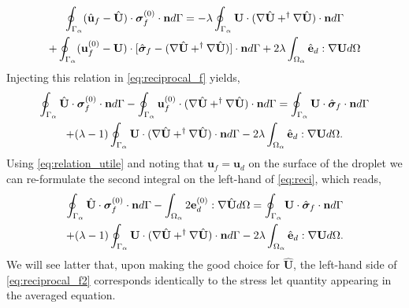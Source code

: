 \begin{multline}
    \oint_{\Gamma_{\alpha}} (\hat{\textbf{u}}_f - \hat{\textbf{U}})\cdot \bm\sigma_f^{(0)} \cdot \textbf{n} d\Gamma
    =
    - \lambda\oint_{\Gamma_{\alpha}}   \textbf{U} \cdot (\mathbf{\nabla} \hat{\textbf{U}} + ^\dagger\mathbf{\nabla} \hat{\textbf{U}})  \cdot \textbf{n} d\Gamma\\
    + \oint_{\Gamma_{\alpha}} (\textbf{u}_f^{(0)} - \textbf{U}) \cdot  [\hat{\bm\sigma}_f -(\mathbf{\nabla} \hat{\textbf{U}} + ^\dagger\mathbf{\nabla} \hat{\textbf{U}})]\cdot \textbf{n}  d\Gamma
    + 2\lambda\int_{\Omega_{\alpha}} \hat{\textbf{e}}_d : \mathbf{\nabla} \textbf{U} d\Omega 
\end{multline}
Injecting this relation in \ref{eq:reciprocal_f} yields, 
\begin{multline}
    \intS{\hat{\textbf{U}}\cdot  \bm\sigma_f^{(0)} \cdot \textbf{n}}
    - \intS{\textbf{u}_f^{(0)}\cdot  (\grad \hat{\textbf{U}} + ^\dagger\grad \hat{\textbf{U}})\cdot \textbf{n} }
    = 
    \intS{\textbf{U}\cdot  \hat{\bm\sigma}_f \cdot \textbf{n}}\\
    + (\lambda - 1)\intS{  \textbf{U} \cdot (\grad \hat{\textbf{U}} + ^\dagger\grad \hat{\textbf{U}})  \cdot \textbf{n}}
    - 2\lambda\intO{\hat{\textbf{e}}_d : \grad \textbf{U}}. 
    \label{eq:reci}
\end{multline}
Using \ref{eq:relation_utile} and noting that $\textbf{u}_f = \textbf{u}_d$ on the surface of the droplet we can re-formulate the second integral on the left-hand of \ref{eq:reci}, which reads,  
\begin{multline}
    \intS{\hat{\textbf{U}}\cdot  \bm\sigma_f^{(0)} \cdot \textbf{n}}
    - \intO{ 2\textbf{e}_d^{(0)} : \grad \hat{\textbf{U}} }
    = 
    \intS{\textbf{U}\cdot  \hat{\bm\sigma}_f \cdot \textbf{n}}\\
    + (\lambda - 1)\intS{  \textbf{U} \cdot (\grad \hat{\textbf{U}} + ^\dagger\grad \hat{\textbf{U}})  \cdot \textbf{n}}
    - 2\lambda\intO{\hat{\textbf{e}}_d : \grad \textbf{U}}. 
    \label{eq:reciprocal_f2}
\end{multline}
We will see latter that, upon making the good choice for $\hat{\textbf{U}}$, the left-hand side of \ref{eq:reciprocal_f2} corresponds identically to the stress let quantity appearing in the averaged equation. 

